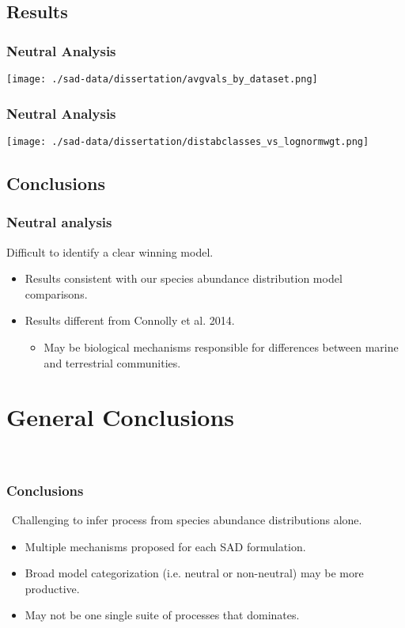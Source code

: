 \documentclass[14pt]{beamer}
\begin{document}
\subsection{Results}
\begin{frame}{}
\frametitle{Neutral Analysis}
\texttt{[image: ./sad-data/dissertation/avgvals\_by\_dataset.png]}
\end{frame}

\begin{frame}{}
\frametitle{Neutral Analysis}
\texttt{[image: ./sad-data/dissertation/distabclasses\_vs\_lognormwgt.png]}
\end{frame}

\subsection{Conclusions}
\begin{frame}
\frametitle{Neutral analysis}
Difficult to identify a clear winning model.
\begin{itemize}
\item Results consistent with our species abundance distribution model comparisons. 
\item Results different from Connolly et al. 2014.
\begin{itemize}
\item May be biological mechanisms responsible for differences between marine and terrestrial communities.
\end{itemize}
\end{itemize}
\end{frame}

\section{General Conclusions}
\begin{frame}{}
~\\ 
\frametitle{Conclusions}\
Challenging to infer process from species abundance distributions alone.
~\\ 
\begin{itemize}
\item Multiple mechanisms proposed for each SAD formulation.
\item Broad model categorization (i.e. neutral or non-neutral) may be more productive.
\item May not be one single suite of processes that dominates.
\end{itemize} 
\end{frame}
\end{document}
